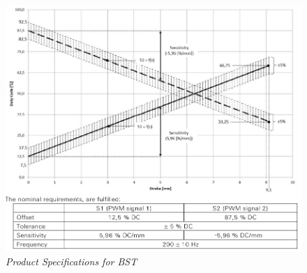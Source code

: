 \documentclass[8pt,compress]{beamer}
\begin{document}
\begin{frame}
\begin{minipage}{0.50\textwidth}
\begin{figure}
      \includegraphics[width=\textwidth]{assets/specs/bst_product_specs.png}
      \caption{\it Product Specifications for BST}
    \end{figure}
  \end{minipage}
\end{frame}
\end{document}
